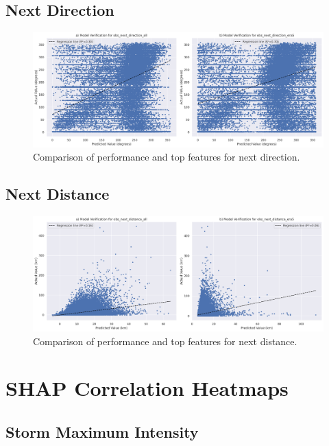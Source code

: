 \subsection{Next Direction}

\begin{figure}[ht]
    \centering
    \includegraphics[width=\textwidth]{../figures/generated/experiments/obs_next_direction/obs_next_direction_summary.png}
    \caption{Comparison of performance and top features for next direction.}
    \label{fig:obs_direction_summary}
\end{figure}

\subsection{Next Distance}

\begin{figure}[ht]
    \centering
    \includegraphics[width=\textwidth]{../figures/generated/experiments/obs_next_distance/obs_next_distance_summary.png}
    \caption{Comparison of performance and top features for next distance.}
    \label{fig:obs_distance_summary}
\end{figure}

\section{SHAP Correlation Heatmaps}
\label{appn:shap-heatmaps}

\subsection{Storm Maximum Intensity}
\label{appn:shap-heatmaps-smi}

